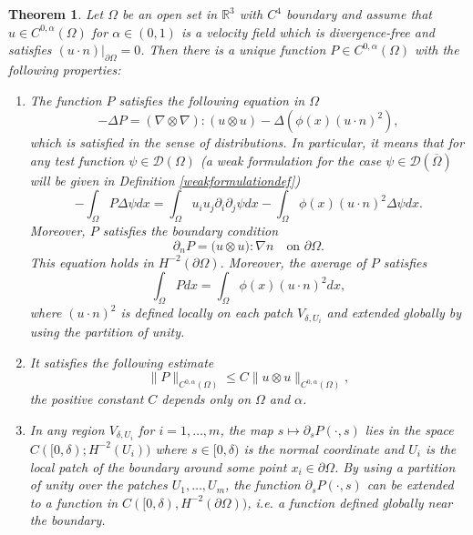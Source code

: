 \documentclass[12pt,a4paper]{article}
\newtheorem{theorem}{Theorem}[section]
\theoremstyle{definition}
\theoremstyle{remark}
\numberwithin{equation}{section}
\begin{document}
\begin{theorem} \label{pressureregularity}
Let $\Omega$ be an open set in $\mathbb{R}^3$ with $C^4$ boundary and assume that $u \in C^{0, \alpha} (\Omega)$ for $\alpha \in (0,1)$ is a velocity field which is divergence-free and satisfies $(u \cdot n) \lvert_{\partial \Omega} = 0$. Then there is a unique function $P \in C^{0, \alpha} (\Omega)$ with the following properties:
\begin{enumerate}
    \item The function $P$ satisfies the following equation in $\Omega$
    \begin{equation}
    - \Delta P = (\nabla \otimes \nabla ) : (u \otimes u) - \Delta (\phi (x) ( u \cdot n )^2),
    \end{equation}
    which is satisfied in the sense of distributions. In particular, it means that for any test function $\psi \in \mathcal{D} (\Omega)$ (a weak formulation for the case $\psi \in \mathcal{D} (\overline{\Omega})$ will be given in Definition \ref{weakformulationdef})
    \begin{equation}
    - \int_{\Omega} P \Delta \psi dx = \int_{\Omega} u_i u_j \partial_i \partial_j \psi dx - \int_{\Omega} \phi (x) (u \cdot n)^2 \Delta \psi dx.
    \end{equation}
    Moreover, $P$ satisfies the boundary condition
    \begin{equation}
    \partial_n P = \big( u \otimes u \big) : \nabla n \quad \text{on } \partial \Omega.
    \end{equation}
    This equation holds in $H^{-2} (\partial \Omega)$.
    Moreover, the average of $P$ satisfies
    \begin{equation}
    \int_\Omega P dx = \int_\Omega \phi (x)  (u \cdot n)^2 dx,
    \end{equation}
    where $(u \cdot n)^2$ is defined locally on each patch $V_{\delta,U_i}$ and extended globally by using the partition of unity. 
    \item It satisfies the following estimate
    \begin{equation}
    \lVert P \rVert_{C^{0, \alpha} (\Omega)} \leq C \lVert u \otimes u \rVert_{C^{0, \alpha} (\Omega)},
    \end{equation}
    the positive constant $C$ depends only on $\Omega$ and $\alpha$.
    \item In any region $V_{\delta,U_i}$ for $i=1, \ldots, m$, the map $s \mapsto \partial_{s} P (\cdot, s)$ lies in the space $C([0, \delta); H^{-2} (U_i )  )$ where $s \in [0, \delta)$ is the normal coordinate and $U_i$ is the local patch of the boundary around some point $x_i \in \partial \Omega$. By using a partition of unity over the patches $U_1, \ldots, U_m$, the function $\partial_{s} P(\cdot, s)$ can be extended to a function in $C([0, \delta), H^{-2} (\partial \Omega))$, i.e. a function defined globally near the boundary.
\end{enumerate}
\end{theorem}
\end{document}
